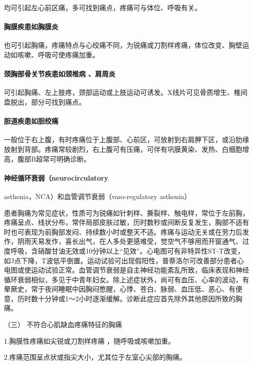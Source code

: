 均可引起左心前区痛，多可找到痛点，疼痛可与体位、呼吸有关。

\paragraph{胸膜疾患如胸膜炎}

也可引起胸痛，疼痛特点与心绞痛不同，为锐痛或刀割样疼痛，体位改变、胸壁运动如咳嗽、呼吸可使疼痛加重。

\paragraph{颈胸部骨关节疾患如颈椎病 、肩周炎}

可引起胸痛、左上肢疼，颈部运动或上肢运动可诱发。X线片可见骨质增生、椎间盘脱出，部分可找到痛点。

\paragraph{胆道疾患如胆绞痛}

一般位于右上腹，有时疼痛位于上腹部、心前区，可放射到右肩胛下区，或沿肋缘放射到背部。疼痛常较剧烈，右上腹可有压痛，可伴有巩膜黄染、发热、白细胞增高，腹部B超常可明确诊断。

\paragraph{神经循环衰弱（neurocirculatory}
asthenia，NCA）和血管调节衰弱（vaso-regulatory asthenia）

患者胸痛为常见症状，性质可为锐痛如针刺样、撕裂样、触电样，常位于左前胸，疼痛呈点、线状分布，常伴局部皮肤过敏，历时数秒或间断反复发生，胸部不适有时也可表现为前胸部发闷、持续数小时或整天不适。疼痛与运动无关或在劳力后发作，阴雨天易发作，喜长出气，在人多处更感难受，觉空气不够用而开窗通气、过度呼吸，含硝酸甘油无效或10分钟以上“见效”。心电图可有非特异性ST-T改变，如J点下降，T波低平倒置。运动试验可出现假阳性，普萘洛尔可改善部分患者心电图或使运动试验正常。血管调节衰弱是自主神经功能紊乱所致，临床表现和神经循环衰弱相似，多见于中青年妇女。除上述症状外，尚可有血压、心率的波动，有晕厥史，常于夜间睡眠中因胸闷憋醒，心悸、苍白、脉弱、血压低、恶心、有便意，历时数十分钟或1～2小时逐渐缓解。诊断此症应首先除外其他原因所致的胸痛。

\hypertarget{text00309.htmlux5cux23CHP10-7-2-3-3}{}
（三） 不符合心肌缺血疼痛特征的胸痛

1.胸膜性疼痛如尖锐或刀割样疼痛 ，随呼吸或咳嗽加重。

2.疼痛范围呈点状或指尖大小，尤其位于左室心尖部的胸痛。

